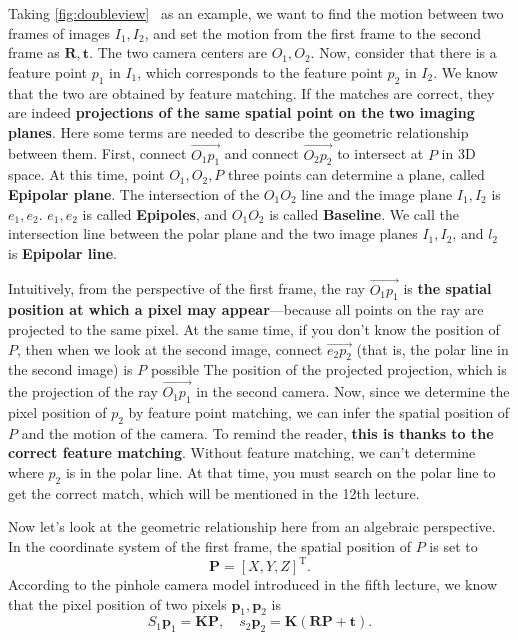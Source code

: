 Taking \autoref{fig:doubleview}~ as an example, we want to find the motion between two frames of images $I_{1}, I_{2}$, and set the motion from the first frame to the second frame as $\bm{ R}, \bm{t}$. The two camera centers are $O_{1}, O_{2}$. Now, consider that there is a feature point $p_{1}$ in $I_{1}$, which corresponds to the feature point $p_{2}$ in $I_{2}$. We know that the two are obtained by feature matching. If the matches are correct, they are indeed \textbf{projections of the same spatial point on the two imaging planes}. Here some terms are needed to describe the geometric relationship between them. First, connect $\overrightarrow{O_{1}p_{1}}$ and connect $\overrightarrow{O_{2}p_{2}}$ to intersect at $P$ in 3D space. At this time, point $O_{1}, O_{2}, P$ three points can determine a plane, called \textbf{Epipolar plane}. The intersection of the $O_{1}O_{2}$ line and the image plane $I_{1}, I_{2}$ is $e_{1}, e_{2}$. $e_{1}, e_{2}$ is called \textbf{Epipoles}, and $O_{1}O_{2}$ is called \textbf{Baseline}. We call the intersection line between the polar plane and the two image planes $I_{1}, I_{2}$, and $l_{2}$ is \textbf{Epipolar line}.

Intuitively, from the perspective of the first frame, the ray $\overrightarrow{O_1 p_1}$ is \textbf{the spatial position at which a pixel may appear}—because all points on the ray are projected to the same pixel. At the same time, if you don't know the position of $P$, then when we look at the second image, connect $\overrightarrow{e_2 p_2}$ (that is, the polar line in the second image) is $P$ possible The position of the projected projection, which is the projection of the ray $\overrightarrow{O_1 p_1}$ in the second camera. Now, since we determine the pixel position of $p_2$ by feature point matching, we can infer the spatial position of $P$ and the motion of the camera. To remind the reader, \textbf{this is thanks to the correct feature matching}. Without feature matching, we can't determine where $p_2$ is in the polar line. At that time, you must search on the polar line to get the correct match, which will be mentioned in the 12th lecture.

Now let's look at the geometric relationship here from an algebraic perspective. In the coordinate system of the first frame, the spatial position of $P$ is set to
\[
\bm{P}=[X,Y,Z]^\mathrm{T}.
\]
According to the pinhole camera model introduced in the fifth lecture, we know that the pixel position of two pixels $\bm{p}_1, \bm{p}_2$ is
\begin{equation}
S_1 {\bm{p}_1} = \bm{KP},\quad s_2 \bm{p}_2 = \bm{K}\left( \bm{RP + t} \right).
\end{equation}

